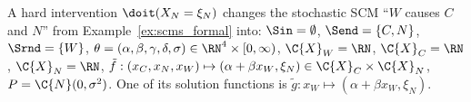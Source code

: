 \begin{Eg}
  A hard intervention $\doit(X_N=\xi_N)$ changes the stochastic SCM ``$W$ causes $C$ and $N$'' from Example~\ref{ex:scms_formal} into:
  $\Sin = \emptyset$, $\Send = \{C,N\}$, $\Srnd = \{W\}$, $\theta = (\alpha,\beta,\gamma,\delta,\sigma) \in \RN^4 \times [0,\infty)$, 
  $\C{X}_W = \RN$, $\C{X}_C = \RN$, $\C{X}_N = \RN$, $\tilde{f} : (x_C, x_N, x_W) \mapsto (\alpha + \beta x_W, \xi_N) \in \C{X}_C \times \C{X}_N$, $P = \C{N}(0,\sigma^2)$.
  One of its solution functions is $\tilde{g} : x_W \mapsto (\alpha + \beta x_W, \xi_N)$. 
%
\end{Eg}

